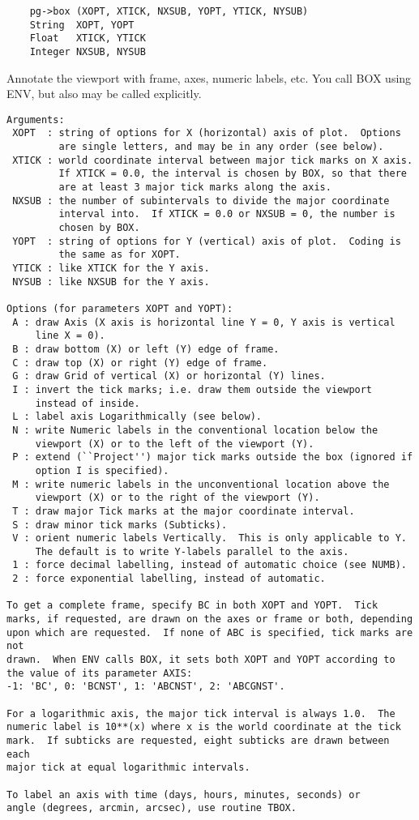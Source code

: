 \begin{verbatim}
    pg->box (XOPT, XTICK, NXSUB, YOPT, YTICK, NYSUB)
    String  XOPT, YOPT
    Float   XTICK, YTICK
    Integer NXSUB, NYSUB
\end{verbatim}

Annotate the viewport with frame, axes, numeric labels, etc.  You call
BOX using ENV, but also may be called explicitly.

\begin{verbatim}
Arguments:
 XOPT  : string of options for X (horizontal) axis of plot.  Options
         are single letters, and may be in any order (see below). 
 XTICK : world coordinate interval between major tick marks on X axis.
         If XTICK = 0.0, the interval is chosen by BOX, so that there
         are at least 3 major tick marks along the axis.
 NXSUB : the number of subintervals to divide the major coordinate
         interval into.  If XTICK = 0.0 or NXSUB = 0, the number is
         chosen by BOX.  
 YOPT  : string of options for Y (vertical) axis of plot.  Coding is
         the same as for XOPT. 
 YTICK : like XTICK for the Y axis.
 NYSUB : like NXSUB for the Y axis.

Options (for parameters XOPT and YOPT):
 A : draw Axis (X axis is horizontal line Y = 0, Y axis is vertical
     line X = 0).  
 B : draw bottom (X) or left (Y) edge of frame.
 C : draw top (X) or right (Y) edge of frame.
 G : draw Grid of vertical (X) or horizontal (Y) lines.
 I : invert the tick marks; i.e. draw them outside the viewport
     instead of inside.  
 L : label axis Logarithmically (see below).
 N : write Numeric labels in the conventional location below the
     viewport (X) or to the left of the viewport (Y). 
 P : extend (``Project'') major tick marks outside the box (ignored if
     option I is specified).  
 M : write numeric labels in the unconventional location above the
     viewport (X) or to the right of the viewport (Y). 
 T : draw major Tick marks at the major coordinate interval.
 S : draw minor tick marks (Subticks).
 V : orient numeric labels Vertically.  This is only applicable to Y.
     The default is to write Y-labels parallel to the axis.
 1 : force decimal labelling, instead of automatic choice (see NUMB).
 2 : force exponential labelling, instead of automatic.

To get a complete frame, specify BC in both XOPT and YOPT.  Tick
marks, if requested, are drawn on the axes or frame or both, depending
upon which are requested.  If none of ABC is specified, tick marks are not
drawn.  When ENV calls BOX, it sets both XOPT and YOPT according to
the value of its parameter AXIS:
-1: 'BC', 0: 'BCNST', 1: 'ABCNST', 2: 'ABCGNST'.

For a logarithmic axis, the major tick interval is always 1.0.  The
numeric label is 10**(x) where x is the world coordinate at the tick
mark.  If subticks are requested, eight subticks are drawn between each
major tick at equal logarithmic intervals.

To label an axis with time (days, hours, minutes, seconds) or
angle (degrees, arcmin, arcsec), use routine TBOX.
\end{verbatim}

